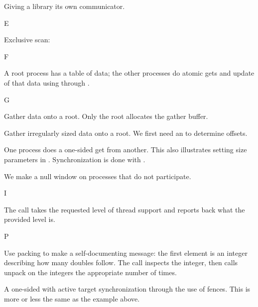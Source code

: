 Giving a library its own communicator.


 {E}


Exclusive scan:
%
%

 {F}


A root process has a table of data; the other processes do 
atomic gets and update of that data using  through .
%

 {G}


Gather data onto a root. Only the root allocates the gather buffer.


Gather irregularly sized data onto a root. We first need an
 to determine offsets.
%
%


One process does a one-sided get from another. This also illustrates
setting size parameters in
. Synchronization is done with
.
%

We make a null window on processes that do not participate.
%

 {I}


The  call takes the requested level of thread support
and reports back what the provided level is.
%

 {P}

%
Use packing to make a self-documenting message: the first element is
an integer describing how many doubles follow. The
 call inspects the integer, then calls unpack
on the integers the appropriate number of times.
%


A one-sided  with active target synchronization
through the use of fences. This is more or less the same as the
 example above.
%
%

